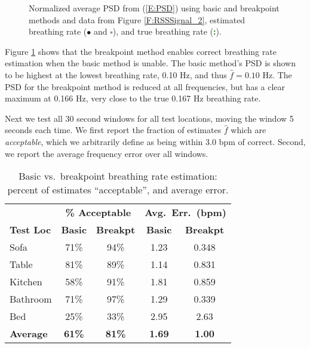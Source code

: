 \documentclass[10pt,journal,letterpaper]{IEEEtran}
\begin{document}
\begin{figure}[tbp]
\centerline{  }
\caption{Normalized average PSD from (\ref{E:PSD}) using basic and breakpoint methods and data from Figure \ref{F:RSSSignal_2}, estimated breathing rate ($\bullet$ and $\square$), and true breathing rate (\textcolor{darkgreen}{\bf :}).}
    \label{F:PSD_2}
\end{figure}

Figure \ref{F:PSD_2} shows that the breakpoint method enables correct breathing rate estimation when the basic method is unable.  The basic method's PSD is shown to be highest at the lowest breathing rate, 0.10 Hz, and thus $\hat{f} = 0.10$ Hz.  The PSD for the breakpoint method is reduced at all frequencies, but has a clear maximum at 0.166 Hz, very close to the true 0.167 Hz breathing rate.  


Next we test all 30 second windows for all test locations, moving the window 5 seconds each time.  
We first report the fraction of estimates $\hat{f}$ which are \emph{acceptable}, which we arbitrarily define as being within 3.0 bpm of correct. Second, we report the average frequency error over all windows.  



\begin{table}[tbp]
\begin{center}
\begin{tabular}{|l|cc|cc|}
\hline
\bf          & \multicolumn{2}{c|}{\bf \% Acceptable} & \multicolumn{2}{c|}{\bf Avg.~Err.~(bpm)} \\
\bf Test Loc &  \bf Basic & \bf Breakpt & \bf Basic & \bf Breakpt \\
\hline
 Sofa       & 71\%   & 94\%  & 1.23 & 0.348 \\ Table      & 81\%   & 89\%  & 1.14 & 0.831 \\ Kitchen    & 58\%   & 91\%  & 1.81 & 0.859 \\
 Bathroom   & 71\%   & 97\%  & 1.29 & 0.339 \\
 Bed        & 25\%   & 33\%  & 2.95 & 2.63  \\
\hline
\bf Average & \bf 61\%   & \bf 81\%  & \bf 1.69 & \bf 1.00 \\
\hline
\end{tabular}
\end{center}
\caption{Basic vs.~breakpoint breathing rate estimation: percent of estimates ``acceptable'', and average error. } \label{T:FreqResults}
\end{table}
\end{document}
